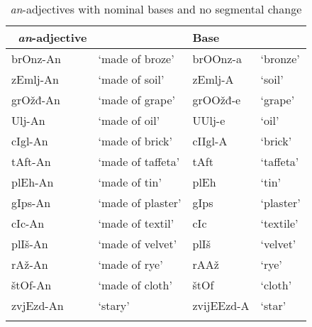 \documentclass[output=paper]{langsci/langscibook}
\begin{document}
\begin{table}
\caption{\textit{an}-adjectives with nominal bases and no segmental change}
\label{tabapp1}
 \begin{tabular}{ l l l l}
\lsptoprule  
\ \textit{an}-adjective &  & Base & 
\\ 
\hline
brOnz-An & `made of broze' & brOOnz-a & `bronze'
\\
zEmlj-An & `made of soil' & zEmlj-A & `soil'
\\
grOžđ-An & `made of grape' & grOOžđ-e & `grape' \\
Ulj-An & `made of oil' & UUlj-e & `oil' \\
cIgl-An & `made of brick' & cIIgl-A & `brick' \\
tAft-An & `made of taffeta' & tAft & `taffeta'\\
plEh-An & `made of tin' & plEh & `tin'\\
gIps-An
 & `made of plaster' & gIps & `plaster'\\
cIc-An & `made of textil' & cIc & `textile' \\ 
plIš-An & `made of velvet' & plIš & `velvet'\\
rAž-An & `made of rye' & rAAž & `rye'\\
štOf-An & `made of cloth' & štOf & `cloth'\\
zvjEzd-An & `stary' & zvijEEzd-A & `star'
\\
 \lspbottomrule
 \end{tabular}
\end{table} 
\end{document}
